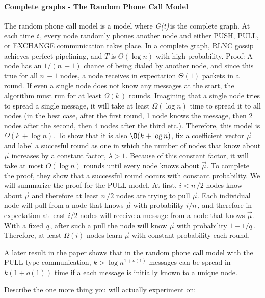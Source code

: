 \documentclass{article} %
\def\numNodes{\textit{n}\,}
\def\graph{\textit{G(t)}\,}
\def\graphtime{\textit{t}\,}
\def\numMessages{\textit{k}\,}
\def\fieldSize{\textit{q}\,}
\begin{document}
\paragraph{Complete graphs - The Random Phone Call Model}
The random phone call model is a model where \graph is the complete graph. At each time \graphtime, every node randomly phones another node and either PUSH, PULL, or EXCHANGE communication takes place.  In a complete graph, RLNC gossip achieves perfect pipelining, and $T$ is $\Theta(\log{n})$ with high probability. 
Proof: A node has an $1/(\numNodes-1)$ chance of being dialed by another node, and since this true for all $\numNodes-1$ nodes, a node receives in expectation $\Theta(1)$ packets in a round. If even a single node does not know any messages at the start, the algorithm must run for at least $\Omega(\numMessages)$ rounds. Imagining that a single node tries to spread a single message, it will take at least $\Omega(\log{n})$ time to spread it to all nodes (in the best case, after the first round, 1 node knows the message, then 2 nodes after the second, then 4 nodes after the third etc.). Therefore, this model is $\Omega(\numMessages + \log{n})$. To show that it is also $\O(\numMessages + \log{n})$, fix a coefficient vector $\vec{\mu}$ and label a succesful round as one in which the number of nodes that know about $\vec{\mu}$ increases by a constant factor, $\lambda > 1$. Because of this constant factor, it will take at most $O(\log{n})$ rounds until every node knows about $\vec{\mu}$. To complete the proof, they show that a successful round occurs with constant probability. We will summarize the proof for the PULL model. At first, $i < \numNodes/2$ nodes know about $\vec{\mu}$ and therefore at least $\numNodes/2$ nodes are trying to pull $\vec{\mu}$. Each individual node will pull from a node that knows $\vec{\mu}$ with probability $i/\numNodes$, and therefore in expectation at least $i/2$ nodes will receive a message from a node that knows $\vec{\mu}$. With a fixed \fieldSize, after such a pull the node will know $\vec{\mu}$ with probability $1-1/\fieldSize$.  Therefore, at least $\Omega(i)$ nodes learn $\vec{\mu}$ with constant probability each round. 

A later result in the paper shows that in the random phone call model with the PULL type communication, $k>\log{n}^{1+o(1)}$ messages can be spread in $k(1+o(1))$ time if a each message is initially known to a unique node.

Describe the one more thing you will actually experiment on: 
\end{document}
